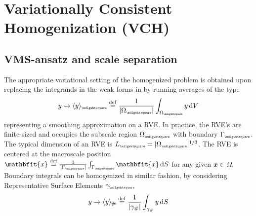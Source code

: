 \documentclass[12pt,a4paper]{article}
\renewcommand{\ta}[1]{\mathbfit{#1}}
\renewcommand{\Box}{\mdlgwhtsquare}
\DeclarePairedDelimiter{\homgen}{\langle}{\rangle_\rve}
\newcommand{\volume}{|\Omega_\rve|}
\newcommand{\rve}{
  {\mathchoice
   {\mbox{\scalebox{0.67}{$\Box$}}}
   {\mbox{\scalebox{0.67}{$\Box$}}}
   {\mbox{\scalebox{0.5}{$\Box$}}}
   {\mbox{\scalebox{0.375}{$\Box$}}}
  }
}
\begin{document}
\section{Variationally Consistent Homogenization (VCH)}

\subsection{VMS-ansatz and scale separation}

The appropriate variational setting of the homogenized problem is obtained upon replacing the integrands in the weak forms in  by running averages of the type
\begin{equation}
    y \mapsto
    \homgen{y}\defeq \frac{1}{\volume}\int_{{\Omega}_\rve} y \dif V
    \label{eq16ba}
\end{equation}
representing a smoothing approximation on a RVE.
In practice, the RVE's are finite-sized and occupies the subscale region $\Omega_\rve$ with boundary $\Gamma_\rve$.
The typical dimension of an RVE is $L_\rve=\volume^{1/3}$.
The RVE is centered at the macroscale position $\bar{\ta{x}}\defeq\frac{1}{|\Gamma_\rve|}\int_{\Gamma_\rve} \ta{x}\dif S$ for any given $\bar{\ta{x}}\in\Omega$.
Boundary integrals can be homogenized in similar fashion, by considering Representative Surface Elements $\gamma_\rve$
\begin{align}
 y \to \langle y \rangle_{\#} \overset{\mathrm{def}}{=} \frac{1}{|\gamma_\#|} \int_{\gamma_\#} y \operatorname{d \!} S
\end{align}
\end{document}
